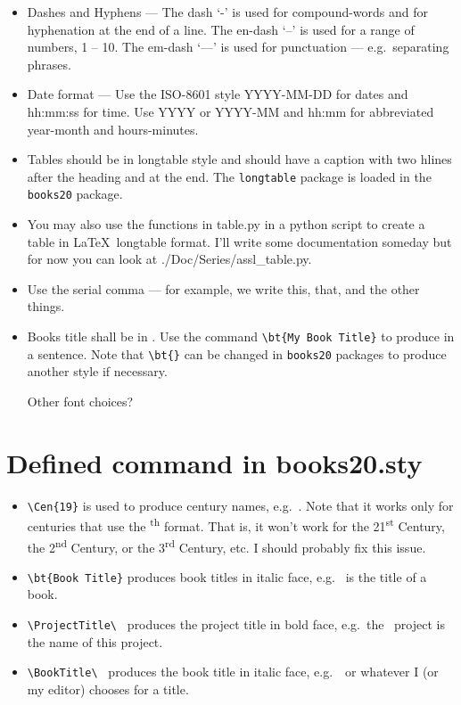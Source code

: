 \begin{itemize}

\item Dashes and Hyphens --- The dash `-' is used for compound-words and for
  hyphenation at the end of a line.  The en-dash `--' is used for a range
  of numbers, 1 -- 10. The em-dash `---' is used for punctuation ---
  e.g.\ separating phrases.

\item Date format --- Use the ISO-8601\cite{isotime} style
  YYYY-MM-DD for dates and hh:mm:ss for time. Use YYYY or YYYY-MM
  and hh:mm for abbreviated year-month and hours-minutes.

\item Tables should be in longtable style and should have a caption
  with two hlines after the heading and at the end. The
  \texttt{longtable} package is loaded in the \texttt{books20}
  package.

\item You may also use the functions in table.py in a python script to create
  a table in \LaTeX\ longtable format.  I'll write some documentation someday
  but for now you can look at ./Doc/Series/assl\_table.py.

\item Use the serial comma --- for example, we write this, that, and the
  other things.

\item Books title shall be in . Use the command
  \verb|\bt{My Book Title}| to produce  in a
  sentence. Note that \verb|\bt{}| can be changed in \texttt{books20}
  packages to produce another style if necessary.

 Other font choices?

\end{itemize}


\section{Defined command in books20.sty}

\begin{itemize}

\item \verb|\Cen{19}| is used to produce century names,
  e.g.\ . Note that it works only for centuries that use the
  \textsuperscript{th} format.  That is, it won't work for the
  21\textsuperscript{st} Century, the 2\textsuperscript{nd} Century,
  or the 3\textsuperscript{rd} Century, etc. I should probably fix
  this issue.

\item \verb|\bt{Book Title}| produces book titles in italic face,
e.g.\  is the title of a book.

\item \verb|\ProjectTitle\ | produces the project title in bold face,
  e.g.\ the \ProjectTitle\ project is the name of this project.

\item \verb|\BookTitle\ | produces the book title in italic face,
  e.g.\ \BookTitle\ or whatever I (or my editor) chooses for a title.

\end{itemize}


